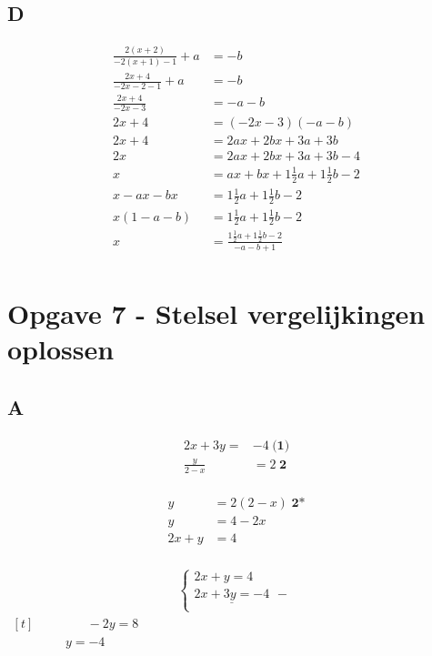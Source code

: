 \documentclass[fleqn]{article}
\begin{document}
\subsection{D}
\begin{align*}
\frac{2(x+2)}{-2(x+1)-1}+a &= -b \\ 
\frac{2x+4}{-2x-2-1}+a &= -b \\ 
\frac{2x+4}{-2x-3} &= -a -b \\ 
2x+4 &= (-2x-3)(-a -b) \\ 
2x+4 &= 2ax +2bx +3a +3b \\ 
2x &= 2ax +2bx +3a +3b -4 \\ 
x &= ax +bx + 1\frac{1}{2}a + 1\frac{1}{2}b -2 \\
x -ax -bx &= 1\frac{1}{2}a + 1\frac{1}{2}b - 2\\
x(1  -a -b) &= 1\frac{1}{2}a + 1\frac{1}{2}b -2\\
x &= \frac{1\frac{1}{2}a + 1\frac{1}{2}b - 2}{-a -b+1}\\
\end{align*}

\clearpage
\section{Opgave 7 - Stelsel vergelijkingen oplossen} 
\subsection{A}
\begin{align*}
2x+3y=&-4 \hspace{3pt}\textbf{(1)}\\ 
\frac{y}{2-x}&=2 \hspace{3pt}\textbf{2} \\
\end{align*}

\begin{align*}
y &= 2(2-x) \hspace{3pt}\textbf{2*}\\
y &= 4-2x\\
2x+y &= 4\\
\end{align*}

\begin{align*}
\begin{cases}
 2x + y = 4\\
\underline{2x + 3y= -4}\hspace{5pt}-\\
\end{cases}
\end{align*}
$\begin{aligned}[t]
\hspace{50pt}-2y=8 \\
\hspace{50pt}y = -4
\end{aligned}$
\end{document}
